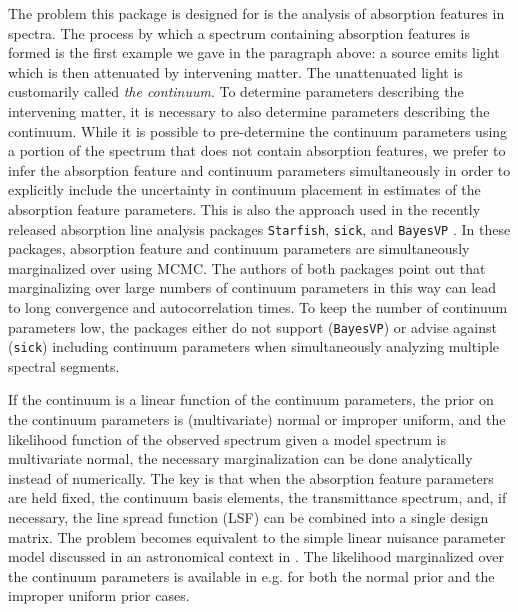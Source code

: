 \documentclass[manuscript]{aastex62}
\begin{document}
The problem this package is designed for is the analysis of absorption features in spectra.
The process by which a spectrum containing absorption features is formed is the first example we gave in the paragraph above: a source emits light which is then attenuated by intervening matter.
The unattenuated light is customarily called \emph{the continuum}.
To determine parameters describing the intervening matter, it is necessary to also determine parameters describing the continuum.
While it is possible to pre-determine the continuum parameters using a portion of the spectrum that does not contain absorption features, we prefer to infer the absorption feature and continuum parameters simultaneously in order to explicitly include the uncertainty in continuum placement in estimates of the absorption feature parameters.
This is also the approach used in the recently released absorption line analysis packages \texttt{Starfish}, \texttt{sick}, and \texttt{BayesVP} \citep{2015ApJ...812..128C,2016ApJS..223....8C,Liang:2018kq}.
In these packages, absorption feature and continuum parameters are simultaneously marginalized over using MCMC.
The authors of both packages point out that marginalizing over large numbers of continuum parameters in this way can lead to long convergence and autocorrelation times.
To keep the number of continuum parameters low, the packages either do not support (\texttt{BayesVP}) or advise against (\texttt{sick}) including continuum parameters when simultaneously analyzing multiple spectral segments.

If the continuum is a linear function of the continuum parameters, the prior on the continuum parameters is (multivariate) normal or improper uniform, and the likelihood function of the observed spectrum given a model spectrum is multivariate normal, the necessary marginalization can be done analytically instead of numerically.
The key is that when the absorption feature parameters are held fixed, the continuum basis elements, the transmittance spectrum, and, if necessary, the line spread function (LSF) can be combined into a single design matrix.
The problem becomes equivalent to the simple linear nuisance parameter model discussed in an astronomical context in \citet{2017RNAAS...1a...7L}.
The likelihood marginalized over the continuum parameters is available in e.g. \citet{Rasmussen:2006vz} for both the normal prior and the improper uniform prior cases.
\end{document}
